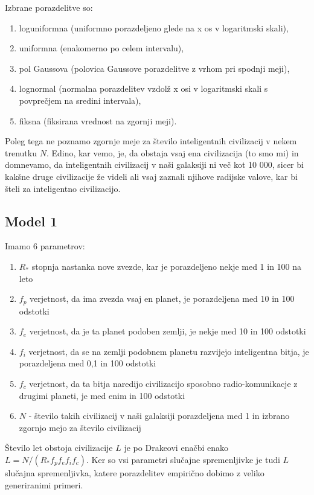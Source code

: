 \documentclass[a4paper]{IEEEtran}
\begin{document}
Izbrane porazdelitve so:
\begin{enumerate}
	\item loguniformna (uniformno porazdeljeno glede na x os v logaritmski skali),
	\item uniformna (enakomerno po celem intervalu),
	\item pol Gaussova (polovica Gaussove porazdelitve z vrhom pri spodnji meji),
	\item lognormal (normalna porazdelitev vzdolž x osi v logaritmski skali s povprečjem na sredini intervala),
	\item fiksna (fiksirana vrednost na zgornji meji).
\end{enumerate}

Poleg tega ne poznamo zgornje meje za število inteligentnih civilizacij v nekem trenutku $N$. Edino, kar vemo, je, da obstaja vsaj ena civilizacija (to smo mi) in domnevamo, da inteligentnih civilizacij v naši galaksiji ni več kot 10 000, sicer bi kakšne druge civilizacije že videli ali vsaj zaznali njihove radijske valove, kar bi šteli za inteligentno civilizacijo.

\subsection{Model 1}

Imamo 6 parametrov:
\begin{enumerate}
	\item $R_\ast$ stopnja nastanka nove zvezde, kar je porazdeljeno nekje med 1 in 100 na leto
	\item $f_p$ verjetnost, da ima zvezda vsaj en planet, je porazdeljena med 10 in 100 odstotki
	\item $f_e$ verjetnost, da je ta planet podoben zemlji, je nekje med 10 in 100 odstotki
	\item $f_i$ verjetnost, da se na zemlji podobnem planetu razvijejo inteligentna bitja, je porazdeljena med 0,1 in 100 odstotki
	\item $f_c$ verjetnost, da ta bitja naredijo civilizacijo sposobno radio-komunikacje z drugimi planeti, je med enim in 100 odstotki
	\item $N$ - število takih civilizacij v naši galaksiji porazdeljena med 1 in izbrano zgornjo mejo za število civilizacij
\end{enumerate}

Število let obstoja civilizacije $L$ je po Drakeovi enačbi enako $L = N / (R_\ast f_p f_e f_i f_c)$. Ker so vsi parametri slučajne spremenljivke je tudi $L$ slučajna spremenljivka, katere porazdelitev empirično dobimo z veliko generiranimi primeri.
\end{document}
